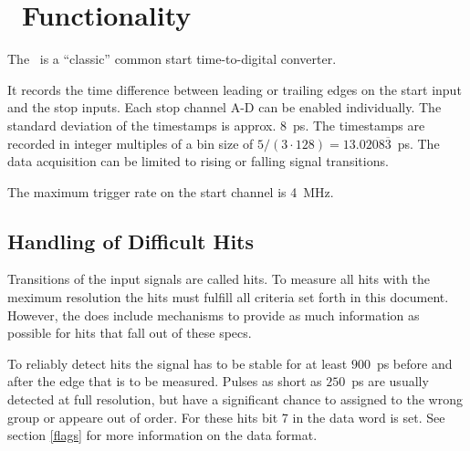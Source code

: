 \section{\deviceName\ Functionality}
	The \deviceName\ is a ``classic'' common start time-to-digital converter. 

	 { %
		It records the time difference between leading or trailing edges on the start input and the stop inputs. 
		Each stop channel A-D can be enabled individually. 
		The standard deviation of the timestamps is approx. $8$~ps. 
		The timestamps are recorded in integer multiples of a bin size of $5/(3\cdot 128) = 13.0208\overline{3}$~ps. 
		The data acquisition can be limited to rising or falling signal transitions. 
		
		The maximum trigger rate on the start channel is 4~MHz.
		
		\subsection{Handling of Difficult Hits}
			Transitions of the input signals are called hits. To measure all hits with the meximum resolution the hits must fulfill all criteria set forth in this document.
			However, the \deviceName does include mechanisms to provide as much information as possible for hits that fall out of these specs.
		
			To reliably detect hits the signal has to be stable for at least $900$~ps before and after the edge that is to be measured. 
			Pulses as short as $250$~ps are usually detected at full resolution, but have a significant chance to assigned to the wrong group or appeare out of order. 
			For these hits bit 7 in the data word is set. See section \ref{flags} for more information on the data format.

}
